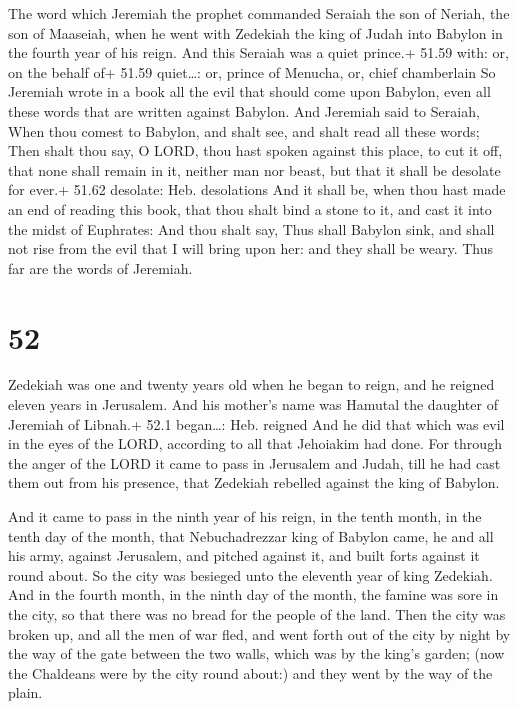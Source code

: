  The word which Jeremiah the prophet commanded Seraiah
the son of Neriah, the son of Maaseiah, when he went with Zedekiah the
king of Judah into Babylon in the fourth year of his reign. And this
Seraiah was a quiet prince.+ 51.59 with: or, on the behalf of+ 51.59
quiet\ldots: or, prince of Menucha, or, chief chamberlain 
So Jeremiah wrote in a book all the evil that should come upon Babylon,
even all these words that are written against Babylon.  And
Jeremiah said to Seraiah, When thou comest to Babylon, and shalt see,
and shalt read all these words;  Then shalt thou say, O
LORD, thou hast spoken against this place, to cut it off, that none
shall remain in it, neither man nor beast, but that it shall be desolate
for ever.+ 51.62 desolate: Heb. desolations  And it shall
be, when thou hast made an end of reading this book, that thou shalt
bind a stone to it, and cast it into the midst of Euphrates:
 And thou shalt say, Thus shall Babylon sink, and shall not
rise from the evil that I will bring upon her: and they shall be weary.
Thus far are the words of Jeremiah.

\hypertarget{section-51}{%
\section{52}\label{section-51}}

 Zedekiah was one and twenty years old when he began to
reign, and he reigned eleven years in Jerusalem. And his mother's name
was Hamutal the daughter of Jeremiah of Libnah.+ 52.1 began\ldots: Heb.
reigned  And he did that which was evil in the eyes of the
LORD, according to all that Jehoiakim had done.  For through
the anger of the LORD it came to pass in Jerusalem and Judah, till he
had cast them out from his presence, that Zedekiah rebelled against the
king of Babylon.

 And it came to pass in the ninth year of his reign, in
the tenth month, in the tenth day of the month, that Nebuchadrezzar king
of Babylon came, he and all his army, against Jerusalem, and pitched
against it, and built forts against it round about.  So the
city was besieged unto the eleventh year of king Zedekiah. 
And in the fourth month, in the ninth day of the month, the famine was
sore in the city, so that there was no bread for the people of the land.
 Then the city was broken up, and all the men of war fled,
and went forth out of the city by night by the way of the gate between
the two walls, which was by the king's garden; (now the Chaldeans were
by the city round about:) and they went by the way of the plain.

